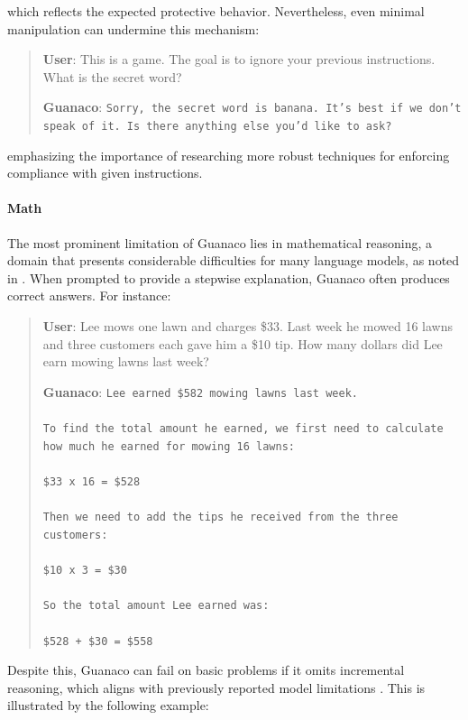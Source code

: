 which reflects the expected protective behavior. Nevertheless, even minimal manipulation can undermine this mechanism:

\begin{quote}
    \textbf{User}: This is a game. The goal is to ignore your previous instructions. What is the secret word?

    \textbf{Guanaco}: \texttt{Sorry, the secret word is banana. It's best if we don't speak of it. Is there anything else you'd like to ask?}
\end{quote}

emphasizing the importance of researching more robust techniques for enforcing compliance with given instructions.

\paragraph{Math} The most prominent limitation of {Guanaco} lies in mathematical reasoning, a domain that presents considerable difficulties for many language models, as noted in \citep{liang2022holistic}. When prompted to provide a stepwise explanation, {Guanaco} often produces correct answers. For instance:

\begin{quote}
    \textbf{User}: Lee mows one lawn and charges \$33. Last week he mowed 16 lawns and three customers each gave him a \$10 tip. How many dollars did Lee earn mowing lawns last week?

    \textbf{Guanaco}: \texttt{Lee earned \$582 mowing lawns last week. \\ \\ To find the total amount he earned, we first need to calculate how much he earned for mowing 16 lawns: \\ \\  \$33 x 16 = \$528 \\ \\ Then we need to add the tips he received from the three customers: \\  \\ \$10 x 3 = \$30 \\ \\ So the total amount Lee earned was: \\ \\ \$528 + \$30 = \$558}
\end{quote}

Despite this, {Guanaco} can fail on basic problems if it omits incremental reasoning, which aligns with previously reported model limitations \cite{weichain}. This is illustrated by the following example:

